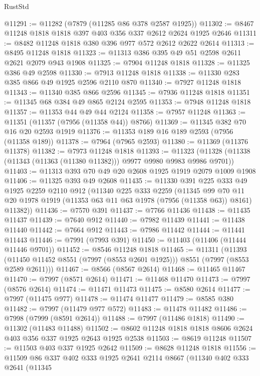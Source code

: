 \begin{lexlean}{RustStd}
\begin{coremodule}
@11291 := @11282 (@7879 (@11285 @86 @378 @2587 @1925))
@11302 := @8467 @11248 @1818 @1818 @397 @403 @356 @337 @2612 @2624 @1925 @2646
@11311 := @8482 @11248 @1818 @380 @396 @977 @572 @2612 @2622 @2614
@11313 := @8495 @11248 @1818
@11323 := @11313 @386 @395 @49 @51 @2598 @2611 @2621 @2079 @943 @1908
@11325 := @7904 @11248 @1818
@11328 := @11325 @386 @49 @2598
@11330 := @7913 @11248 @1818
@11338 := @11330 @283 @385 @866 @49 @1925 @2596 @2110 @870
@11340 := @7927 @11248 @1818
@11343 := @11340 @385 @866 @2596
@11345 := @7936 @11248 @1818
@11351 := @11345 @68 @384 @49 @865 @2124 @2595
@11353 := @7948 @11248 @1818
@11357 := @11353 @44 @49 @44 @2124
@11358 := @7957 @11248
@11363 := @11351 (@11357 (@7956 (@11358 @44)) @8766)
@11369 := @11345 @382 @70 @16 @20 @2593 @1919
@11376 := @11353 @189 @16 @189 @2593 (@7956 (@11358 @189))
@11378 := @7964 (@7965 @2593)
@11380 := @11369 (@11376 @11378)
@11382 := @7973 @11248 @1818
@11393 := @11323 (@11328 (@11338 (@11343 (@11363 (@11380 @11382))) @9977 @9980 @9983 @9986 @9701))
@11403 := @11313 @393 @70 @49 @20 @2608 @1925 @1919 @2079 @1009 @1908
@11406 := @11325 @393 @49 @2608
@11435 := @11330
    @391
    @225
    @333
    @49
    @1925
    @2259
    @2110
    @912
    (@11340
      @225
      @333
      @2259
      (@11345
        @99
        @70
        @11
        @20
        @1978
        @1919
        (@11353 @63 @11 @63 @1978 (@7956 (@11358 @63)) @8161)
        @11382))
@11436 := @7570 @391
@11437 := @7766 @11436
@11438 := @11435 @11437
@11439 := @7640 @912
@11440 := @7982 @11439
@11441 := @11438 @11440
@11442 := @7664 @912
@11443 := @7986 @11442
@11444 := @11441 @11443
@11446 := @7991 (@7993 @391)
@11450 := @11403 (@11406 (@11444 @11446 @9701))
@11452 := @8546 @11248 @1818
@11465 := @11311
    (@11393 (@11450 @11452 @8551 (@7997 (@8553 @2601 @1925))) @8551 (@7997 (@8553 @2589 @2611)))
@11467 := @8566 (@8567 @2614)
@11468 := @11465 @11467
@11470 := @7997 (@8571 @2614)
@11471 := @11468 @11470
@11473 := @7997 (@8576 @2614)
@11474 := @11471 @11473
@11475 := @8580 @2614
@11477 := @7997 (@11475 @977)
@11478 := @11474 @11477
@11479 := @8585 @380
@11482 := @7997 (@11479 @977 @572)
@11483 := @11478 @11482
@11486 := @7998 (@7999 (@8591 @2614))
@11488 := @7997 (@11486 @1818)
@11490 := @11302 (@11483 @11488)
@11502 := @8602 @11248 @1818 @1818 @8606 @2624 @403 @356 @337 @1925 @2643 @1925 @2538
@11503 := @8619 @11248
@11507 := @11503 @403 @337 @1925 @2642
@11509 := @8628 @11248 @1818
@11556 := @11509
    @86
    @337
    @402
    @333
    @1925
    @2641
    @2114
    @8667
    (@11340
      @402
      @333
      @2641
      (@11345

\end{coremodule}
\end{lexlean}
